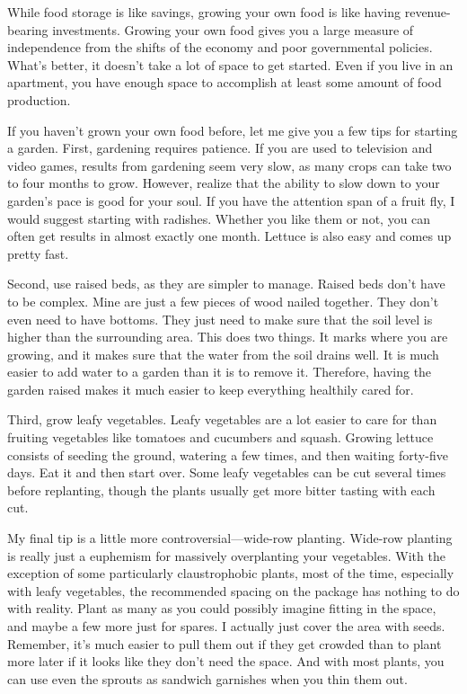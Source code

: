 While food storage is like savings, growing your own food is like having
revenue-bearing investments. Growing your own food gives you a large
measure of independence from the shifts of the economy and poor
governmental policies. What’s better, it doesn’t take a lot of space to
get started. Even if you
live in an apartment,
you have enough space to accomplish at least some amount of food
production.

If you haven’t grown your own food before, let me give you a few tips
for starting a
garden. First, gardening requires patience. If you are used to
television and video games, results from gardening seem very slow, as
many crops can take two to four months to grow. However, realize that
the ability to slow down to your garden’s pace is good for your soul.
If you have the attention span of a fruit fly, I would suggest starting
with radishes. Whether you like them or not, you can often get results
in almost exactly one month. Lettuce is also easy and comes up pretty
fast.

Second, use raised beds, as they are simpler to manage. Raised beds
don’t have to be complex. Mine are just a few pieces of wood nailed
together. They don’t even need to have bottoms. They just need to make
sure that the soil level is higher than the surrounding area. This does
two things. It marks where you are growing, and it makes sure that the
water from the soil drains well. It is much easier to add water to a
garden than it is to remove it. Therefore, having the garden raised
makes it much easier to keep everything healthily cared for. 

Third, grow leafy vegetables. Leafy vegetables are a lot easier to care
for than fruiting vegetables like tomatoes and cucumbers and squash.
Growing lettuce consists of seeding the ground, watering a few times,
and then waiting forty-five days. Eat it and then start over. Some
leafy vegetables can be cut several times before replanting, though the
plants usually get more bitter tasting with each cut. 

My final tip is a little more controversial—wide-row planting. Wide-row
planting is really just a euphemism for massively overplanting your
vegetables. With the exception of some particularly claustrophobic
plants, most of the time, especially with leafy vegetables, the
recommended spacing on the package has nothing to do with reality.
Plant as many as you could possibly imagine fitting in the space, and
maybe a few more just for spares. I actually just cover the area with
seeds. Remember, it’s much easier to pull them out if they get crowded
than to plant more later if it looks like they don’t need the space.
And with most plants, you can use even the sprouts as sandwich
garnishes when you thin them out.

